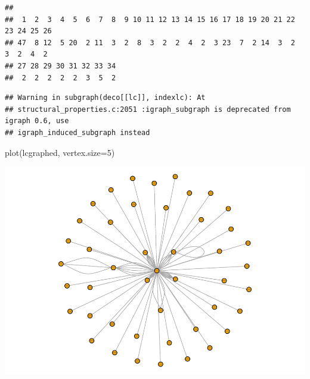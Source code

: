 \documentclass[
]{article}
\newenvironment{Shaded}{\begin{snugshade}}{\end{snugshade}}
\newcommand{\AttributeTok}[1]{\textcolor[rgb]{0.77,0.63,0.00}{#1}}
\newcommand{\DecValTok}[1]{\textcolor[rgb]{0.00,0.00,0.81}{#1}}
\newcommand{\DocumentationTok}[1]{\textcolor[rgb]{0.56,0.35,0.01}{\textbf{\textit{#1}}}}
\newcommand{\FunctionTok}[1]{\textcolor[rgb]{0.00,0.00,0.00}{#1}}
\newcommand{\NormalTok}[1]{#1}
\newcommand{\OtherTok}[1]{\textcolor[rgb]{0.56,0.35,0.01}{#1}}
\newcommand{\SpecialCharTok}[1]{\textcolor[rgb]{0.00,0.00,0.00}{#1}}
\begin{document}
\begin{verbatim}
## 
##  1  2  3  4  5  6  7  8  9 10 11 12 13 14 15 16 17 18 19 20 21 22 23 24 25 26 
## 47  8 12  5 20  2 11  3  2  8  3  2  2  4  2  3 23  7  2 14  3  2  3  2  4  2 
## 27 28 29 30 31 32 33 34 
##  2  2  2  2  2  3  5  2
\end{verbatim}

\begin{Shaded}
\end{Shaded}

\begin{verbatim}
## Warning in subgraph(deco[[lc]], indexlc): At
## structural_properties.c:2051 :igraph_subgraph is deprecated from igraph 0.6, use
## igraph_induced_subgraph instead
\end{verbatim}

\begin{Shaded}
\begin{Highlighting}[]
\FunctionTok{plot}\NormalTok{(lcgraphed, }\AttributeTok{vertex.size=}\DecValTok{5}\NormalTok{)}
\end{Highlighting}
\end{Shaded}

\includegraphics{SMI-Project-2022_files/figure-latex/unnamed-chunk-3-3.pdf}
\end{document}
